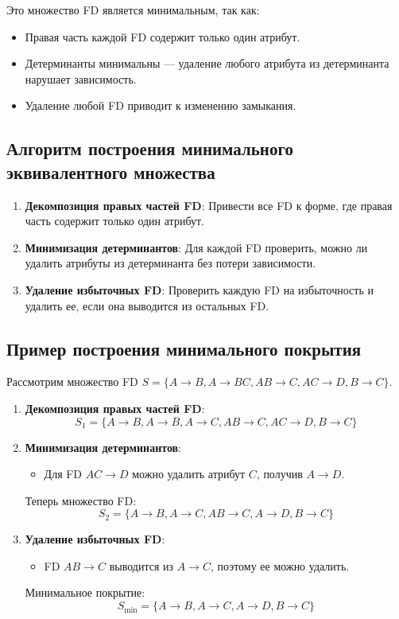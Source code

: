 \documentclass[a4paper,12pt]{article}
\begin{document}
Это множество FD является минимальным, так как:
\begin{itemize}
    \item Правая часть каждой FD содержит только один атрибут.
    \item Детерминанты минимальны — удаление любого атрибута из детерминанта нарушает зависимость.
    \item Удаление любой FD приводит к изменению замыкания.
\end{itemize}

\subsection{Алгоритм построения минимального эквивалентного множества}

\begin{enumerate}
    \item \textbf{Декомпозиция правых частей FD}: Привести все FD к форме, где правая часть содержит только один атрибут.
    \item \textbf{Минимизация детерминантов}: Для каждой FD проверить, можно ли удалить атрибуты из детерминанта без потери зависимости.
    \item \textbf{Удаление избыточных FD}: Проверить каждую FD на избыточность и удалить ее, если она выводится из остальных FD.
\end{enumerate}

\subsection{Пример построения минимального покрытия}

Рассмотрим множество FD $S = \{A \rightarrow B, A \rightarrow BC, AB \rightarrow C, AC \rightarrow D, B \rightarrow C\}$.

\begin{enumerate}
    \item \textbf{Декомпозиция правых частей FD}:
    \[
    S_1 = \{A \rightarrow B, A \rightarrow B, A \rightarrow C, AB \rightarrow C, AC \rightarrow D, B \rightarrow C\}
    \]
    \item \textbf{Минимизация детерминантов}:
    \begin{itemize}
        \item Для FD $AC \rightarrow D$ можно удалить атрибут $C$, получив $A \rightarrow D$.
    \end{itemize}
    Теперь множество FD:
    \[
    S_2 = \{A \rightarrow B, A \rightarrow C, AB \rightarrow C, A \rightarrow D, B \rightarrow C\}
    \]
    \item \textbf{Удаление избыточных FD}:
    \begin{itemize}
        \item FD $AB \rightarrow C$ выводится из $A \rightarrow C$, поэтому ее можно удалить.
    \end{itemize}
    Минимальное покрытие:
    \[
    S_{\text{min}} = \{A \rightarrow B, A \rightarrow C, A \rightarrow D, B \rightarrow C\}
    \]
\end{enumerate}
\end{document}
